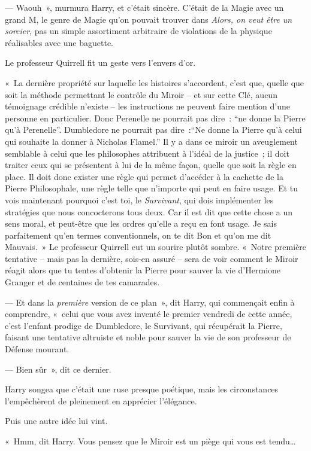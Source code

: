 --- Waouh~», murmura Harry, et c'était sincère. C'était de la Magie avec un grand M, le genre de Magie qu'on pouvait trouver dans \emph{Alors, on veut être un sorcier}, pas un simple assortiment arbitraire de violations de la physique réalisables avec une baguette.

Le professeur Quirrell fit un geste vers l'envers d'or.

«~La dernière propriété sur laquelle les histoires s'accordent, c'est que, quelle que soit la méthode permettant le contrôle du Miroir -- et sur cette Clé, aucun témoignage crédible n'existe -- les instructions ne peuvent faire mention d'une personne en particulier. Donc Perenelle ne pourrait pas dire~: “ne donne la Pierre qu'à Perenelle”. Dumbledore ne pourrait pas dire~:“Ne donne la Pierre qu'à celui qui souhaite la donner à Nicholas Flamel.” Il y a dans ce miroir un aveuglement semblable à celui que les philosophes attribuent à l'idéal de la justice~; il doit traiter ceux qui se présentent à lui de la même façon, quelle que soit la règle en place. Il doit donc exister une règle qui permet d'accéder à la cachette de la Pierre Philosophale, une règle telle que n'importe qui peut en faire usage. Et tu vois maintenant pourquoi c'est toi, le \emph{Survivant}, qui dois implémenter les stratégies que nous concocterons tous deux. Car il est dit que cette chose a un sens moral, et peut-être que les ordres qu'elle a reçu en font usage. Je sais parfaitement qu'en termes conventionnels, on te dit Bon et qu'on me dit Mauvais.~» Le professeur Quirrell eut un sourire plutôt sombre. «~Notre première tentative -- mais pas la dernière, sois-en assuré -- sera de voir comment le Miroir réagit alors que tu tentes d'obtenir la Pierre pour sauver la vie d'Hermione Granger et de centaines de tes camarades.

--- Et dans la \emph{première} version de ce plan~», dit Harry, qui commençait enfin à comprendre, «~celui que vous avez inventé le premier vendredi de cette année, c'est l'enfant prodige de Dumbledore, le Survivant, qui récupérait la Pierre, faisant une tentative altruiste et noble pour sauver la vie de son professeur de Défense mourant.

--- Bien sûr~», dit ce dernier.

Harry songea que c'était une ruse presque poétique, mais les circonstances l'empêchèrent de pleinement en apprécier l'élégance.

Puis une autre idée lui vint.

«~Hmm, dit Harry. Vous pensez que le Miroir est un piège qui vous est tendu…


